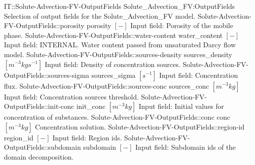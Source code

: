 \begin{SelectionType}
	{IT::Solute-Advection-FV-OutputFields}
	{Solute{\_}Advection{\_}FV:OutputFields}
	{{{Selection of output fields for the Solute{\_}Advection{\_}FV model.}%
}}
		\SelectionItem
			{Solute-Advection-FV-OutputFields::porosity}
			{porosity}
			{{{}{$[-]$}{ Input field: Porosity of the mobile phase.}%
}}
		\SelectionItem
			{Solute-Advection-FV-OutputFields::water-content}
			{water{\_}content}
			{{{}{$[-]$}{ Input field: INTERNAL. Water content passed from unsaturated Darcy flow model.}%
}}
		\SelectionItem
			{Solute-Advection-FV-OutputFields::sources-density}
			{sources{\_}density}
			{{{}{$[m^{-3}kgs^{-1}]$}{ Input field: Density of concentration sources.}%
}}
		\SelectionItem
			{Solute-Advection-FV-OutputFields::sources-sigma}
			{sources{\_}sigma}
			{{{}{$[s^{-1}]$}{ Input field: Concentration flux.}%
}}
		\SelectionItem
			{Solute-Advection-FV-OutputFields::sources-conc}
			{sources{\_}conc}
			{{{}{$[m^{-3}kg]$}{ Input field: Concentration sources threshold.}%
}}
		\SelectionItem
			{Solute-Advection-FV-OutputFields::init-conc}
			{init{\_}conc}
			{{{}{$[m^{-3}kg]$}{ Input field: Initial values for concentration of substances.}%
}}
		\SelectionItem
			{Solute-Advection-FV-OutputFields::conc}
			{conc}
			{{{}{$[m^{-3}kg]$}{ Concentration solution.}%
}}
		\SelectionItem
			{Solute-Advection-FV-OutputFields::region-id}
			{region{\_}id}
			{{{}{$[-]$}{ Input field: Region ids.}%
}}
		\SelectionItem
			{Solute-Advection-FV-OutputFields::subdomain}
			{subdomain}
			{{{}{$[-]$}{ Input field: Subdomain ids of the domain decomposition.}%
}}
\end{SelectionType}
